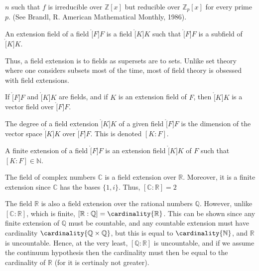 \documentclass{article}                                                        %
\begin{document}
        $n$ such that $f$ is irreducible over $\mathbb{Z}[x]$ but reducible
        over $\mathbb{Z}_{p}[x]$ for every prime $p$.
        (See Brandl, R. American Mathematical Monthly, 1986).
        \begin{definition}
            An extension field of a field $\ring[F]{F}$ is a field $\ring[K]{K}$
            such that $\ring[F]{F}$ is a subfield of $\ring[K]{K}$.
        \end{definition}
        Thus, a field extension is to fields as supersets are to sets. Unlike
        set theory where one considers subsets most of the time, most of field
        theory is obsessed with field extensions.
        \begin{theorem}
            If $\ring[F]{F}$ and $\ring[K]{K}$ are fields, and if $K$ is an
            extension field of $F$, then $\ring[K]{K}$ is a vector field
            over $\ring[F]{F}$.
        \end{theorem}
        \begin{definition}
            The degree of a field extension $\ring[K]{K}$ of a given field
            $\ring[F]{F}$ is the dimension of the vector space
            $\ring[K]{K}$ over $\ring[F]{F}$. This is denoted $[K:F]$.
        \end{definition}
        \begin{definition}
            A finite extension of a field $\ring[F]{F}$ is an extension field
            $\ring[K]{K}$ of $F$ such that $[K:F]\in\mathbb{N}$.
        \end{definition}
        \begin{example}
            The field of complex numbers $\mathbb{C}$ is a field extension over
            $\mathbb{R}$. Moreover, it is a finite extension since $\mathbb{C}$
            has the bases $\{1,i\}$. Thus, $[\mathbb{C}:\mathbb{R}]=2$
        \end{example}
        \begin{example}
            The field $\mathbb{R}$ is also a field extension over the rational
            numbers $\mathbb{Q}$. However, unlike $[\mathbb{C}:\mathbb{R}]$,
            which is finite, $[\mathbb{R}:\mathbb{Q}]=\cardinality{\mathbb{R}}$.
            This can be shown since any finite extension of $\mathbb{Q}$ must
            be countable, and any countable extension must have cardinality
            $\cardinality{\mathbb{Q}\times\mathbb{Q}}$, but this is equal to
            $\cardinality{\mathbb{N}}$, and $\mathbb{R}$ is uncountable. Hence,
            at the very least, $[\mathbb{Q}:\mathbb{R}]$ is uncountable, and if
            we assume the continuum hypothesis then the cardinality must then
            be equal to the cardinality of $\mathbb{R}$ (for it is certinaly not
            greater).
        \end{example}
\end{document}
